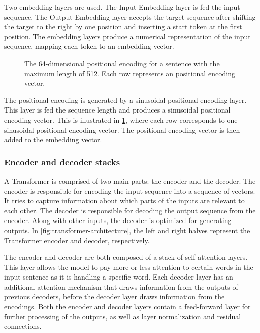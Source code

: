 Two embedding layers are used. The Input Embedding layer is fed the input sequence. The Output Embedding layer accepts the target sequence after shifting the target to the right by one position and inserting a start token at the first position. The embedding layers produce a numerical representation of the input sequence, mapping each token to an embedding vector.

\begin{figure}[htp]
    \centering
    
    \caption{The 64-dimensional positional encoding for a sentence with the maximum length of 512. Each row represents an positional encoding vector.}
    \label{fig:positional-embedding}
\end{figure}

The positional encoding is generated by a sinusoidal positional encoding layer. This layer is fed the sequence length and produces a sinusoidal positional encoding vector. This is illustrated in \cref{fig:positional-embedding}, where each row corresponds to one sinusoidal positional encoding vector. The positional encoding vector is then added to the embedding vector.

\subsubsection{Encoder and decoder stacks}
\label{sec:encoder-decoder-stacks}
A Transformer is comprised of two main parts: the encoder and the decoder. The encoder is responsible for encoding the input sequence into a sequence of vectors. It tries to capture information about which parts of the inputs are relevant to each other. The decoder is responsible for decoding the output sequence from the encoder. Along with other inputs, the decoder is optimized for generating outputs. In \cref{fig:transformer-architecture}, the left and right halves represent the Transformer encoder and decoder, respectively. 

The encoder and decoder are both composed of a stack of self-attention layers. This layer allows the model to pay more or less attention to certain words in the input sentence as it is handling a specific word. Each decoder layer has an additional attention mechanism that draws information from the outputs of previous decoders, before the decoder layer draws information from the encodings. Both the encoder and decoder layers contain a feed-forward layer for further processing of the outputs, as well as layer normalization and residual connections.

